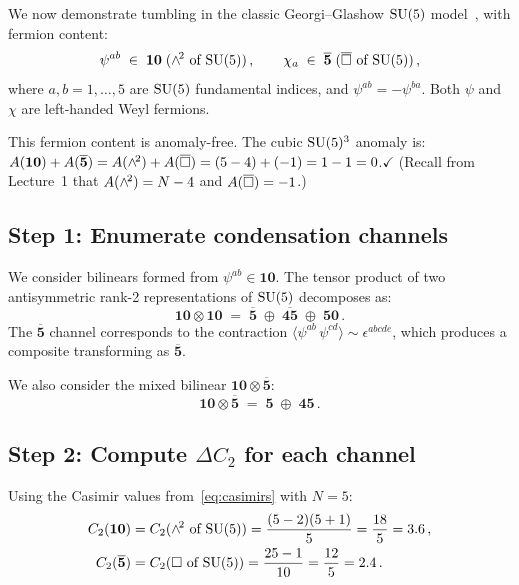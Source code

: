 \documentclass[11pt,a4paper]{article}
\begin{document}
We now demonstrate tumbling in the classic Georgi--Glashow $\mathrm{SU}(5)$
model~\cite{RDS1980}, with fermion content:
\begin{equation}\label{eq:SU5-content}
  \psi^{ab} \;\in\; \mathbf{10}\;(\wedge^{\!2} \text{ of } \mathrm{SU}(5))\,,
  \qquad
  \chi_a \;\in\; \overline{\mathbf{5}}\;(\overline{\square} \text{ of } \mathrm{SU}(5))\,,
\end{equation}
where $a, b = 1, \ldots, 5$ are $\mathrm{SU}(5)$ fundamental indices, and
$\psi^{ab} = -\psi^{ba}$.  Both $\psi$ and $\chi$ are left-handed
Weyl fermions.

\begin{remark}
  This fermion content is anomaly-free.  The cubic $\mathrm{SU}(5)^3$ anomaly is:
  $A(\mathbf{10}) + A(\overline{\mathbf{5}})
  = A(\wedge^{\!2}) + A(\overline{\square})
  = (5-4) + (-1) = 1 - 1 = 0$.\quad$\checkmark$
  (Recall from Lecture~1 that $A(\wedge^{\!2}) = N - 4$ and
  $A(\overline{\square}) = -1$.)
\end{remark}

\subsection{Step 1: Enumerate condensation channels}

We consider bilinears formed from $\psi^{ab} \in \mathbf{10}$.  The
tensor product of two antisymmetric rank-2 representations of $\mathrm{SU}(5)$
decomposes as:
\begin{equation}\label{eq:10x10}
  \mathbf{10} \otimes \mathbf{10}
  \;=\;
  \overline{\mathbf{5}} \;\oplus\; \overline{\mathbf{45}}
  \;\oplus\; \mathbf{50}\,.
\end{equation}
The $\overline{\mathbf{5}}$ channel corresponds to the contraction
$\langle \psi^{ab}\, \psi^{cd}\rangle \sim \epsilon^{abcde}$, which
produces a composite transforming as $\overline{\mathbf{5}}$.

We also consider the mixed bilinear $\mathbf{10} \otimes
\overline{\mathbf{5}}$:
\begin{equation}\label{eq:10x5bar}
  \mathbf{10} \otimes \overline{\mathbf{5}}
  \;=\;
  \mathbf{5} \;\oplus\; \mathbf{45}\,.
\end{equation}

\subsection{Step 2: Compute $\Delta C_2$ for each channel}

Using the Casimir values from~\eqref{eq:casimirs} with $N = 5$:
\begin{align}
  C_2(\mathbf{10})
  &= C_2(\wedge^{\!2}\text{ of }\mathrm{SU}(5))
  = \frac{(5-2)(5+1)}{5}
  = \frac{18}{5} = 3.6\,,
  \label{eq:C2-10} \\
  C_2(\overline{\mathbf{5}})
  &= C_2(\square\text{ of }\mathrm{SU}(5))
  = \frac{25-1}{10}
  = \frac{12}{5} = 2.4\,.
  \label{eq:C2-5bar}
\end{align}
\end{document}
